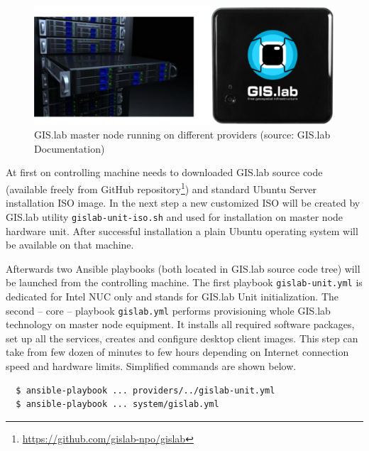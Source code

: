 \documentclass{isprs}
\begin{document}
\begin{figure}[ht!]
\begin{center}
  \includegraphics[width=0.9\columnwidth]{figures/gislab-unit.png}
  \caption{GIS.lab master node running on different providers (source:
    GIS.lab Documentation)}
\label{fig:gislab_infrastructure}
\end{center}
\end{figure}

At first on controlling machine needs to downloaded GIS.lab source
code (available freely from GitHub
repository\footnote{\url{https://github.com/gislab-npo/gislab}}) and
standard Ubuntu Server installation ISO image. In the next step a new
customized ISO will be created by GIS.lab utility
\texttt{gislab-unit-iso.sh} and used for installation on master node
hardware unit. After successful installation a plain Ubuntu operating
system will be available on that machine.

Afterwards two Ansible playbooks (both located in GIS.lab source code
tree) will be launched from the controlling machine. The first playbook
\texttt{gislab-unit.yml} is dedicated for Intel NUC only and stands
for GIS.lab Unit initialization. The second -- core -- playbook
\texttt{gislab.yml} performs provisioning whole GIS.lab technology on
master node equipment. It installs all required software packages, set
up all the services, creates and configure desktop client images. This
step can take from few dozen of minutes to few hours depending on Internet
connection speed and hardware limits. Simplified commands are shown
below.

\begin{lstlisting}
  $ ansible-playbook ... providers/../gislab-unit.yml
  $ ansible-playbook ... system/gislab.yml
\end{lstlisting}
\end{document}
